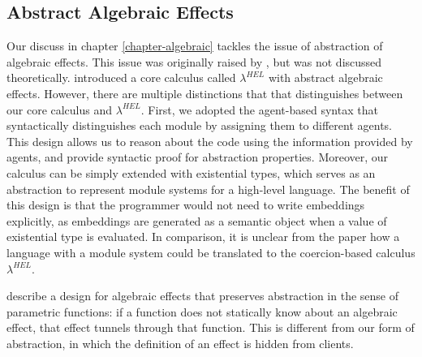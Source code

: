 \subsection{Abstract Algebraic Effects}
Our discuss in chapter \ref{chapter-algebraic} tackles the issue of abstraction of algebraic effects. This issue was originally raised by \citet{leijen18}, but was not discussed theoretically. \citet{biernacki19} introduced a core calculus called $\lambda^{HEL}$ with abstract algebraic effects. However, there are multiple distinctions that that distinguishes between our core calculus and $\lambda^{HEL}$. First, we adopted the agent-based syntax that syntactically distinguishes each module by assigning them to different agents. This design allows us to reason about the code using the information provided by agents, and provide syntactic proof for abstraction properties. Moreover, our calculus can be simply extended with existential types, which serves as an abstraction to represent module systems for a high-level language. The benefit of this design is that the programmer would not need to write embeddings explicitly, as embeddings are generated as a semantic object when a value of existential type is evaluated. In comparison, it is unclear from the paper \cite{biernacki19} how a language with a module system could be translated to the coercion-based calculus $\lambda^{HEL}$.

\citet{Zhang19} describe a design for algebraic effects that preserves abstraction in the sense of parametric functions: if a function does not statically know about an algebraic effect, that effect tunnels through that function.  This is different from our form of abstraction, in which the definition of an effect is hidden from clients.






